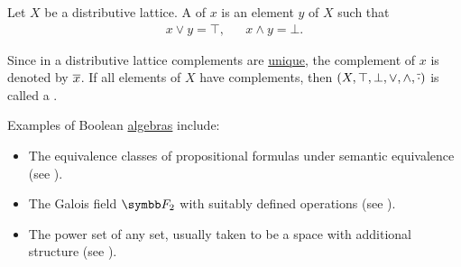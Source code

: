 \begin{definition}\label{def:boolean_algebra}\cite{nLab:boolean_algebra}
  Let \( X \) be a distributive lattice. A  of \( x \) is an element \( y \) of \( X \) such that
  \begin{align*}
    x \vee y = \top, && x \wedge y = \bot.
  \end{align*}

  Since in a distributive lattice complements are \hyperref[thm:boolean_algebra_properties/unique_complement]{unique}, the complement of \( x \) is denoted by \( \overline{x} \). If all elements of \( X \) have complements, then \( (X, \top, \bot, \vee, \wedge, \overline{\cdot}) \) is called a .
\end{definition}

\begin{example}\label{ex:boolean_algebras}
  Examples of Boolean \hyperref[def:boolean_algebra]{algebras} include:

  \begin{itemize}
    \item The equivalence classes of propositional formulas under semantic equivalence (see ).
    \item The Galois field \( \BF_2 \) with suitably defined operations (see ).
    \item The power set of any set, usually taken to be a space with additional structure (see ).
  \end{itemize}
\end{example}

